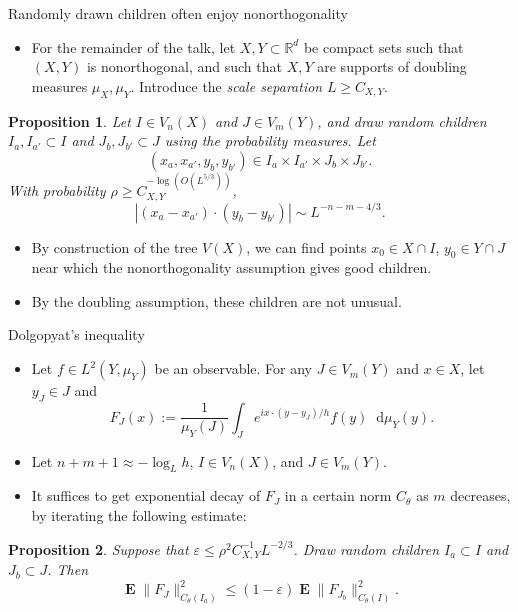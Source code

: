 \documentclass[10pt]{beamer}
\newcommand{\RR}{\mathbb{R}}
\newcommand*\dif{\mathop{}\!\mathrm{d}}
\DeclareMathOperator*{\Expect}{\mathbf E}
\newtheorem{proposition}{Proposition}
\begin{document}
\begin{frame}{Randomly drawn children often enjoy nonorthogonality}
\begin{itemize}
\item For the remainder of the talk, let $X, Y \subset \RR^d$ be compact sets such that $(X, Y)$ is nonorthogonal, and such that $X, Y$ are supports of doubling measures $\mu_X, \mu_Y$. Introduce the \emph{scale separation} $L \geq C_{X, Y}$. \pause
\end{itemize}

\begin{proposition}
Let $I \in V_n(X)$ and $J \in V_m(Y)$, and draw random children $I_a, I_{a'} \subset I$ and $J_b, J_{b'} \subset J$ using the probability measures.
Let
$$(x_a, x_{a'}, y_b, y_{b'}) \in I_a \times I_{a'} \times J_b \times J_{b'}.$$
With probability $\rho \geq C_{X, Y}^{-\log(O(L^{5/3}))}$,
$$|(x_a - x_{a'}) \cdot (y_b - y_{b'})| \sim L^{-n-m-4/3}.$$
\end{proposition} \pause

\begin{itemize}
\item By construction of the tree $V(X)$, we can find points $x_0 \in X \cap I$, $y_0 \in Y \cap J$ near which the nonorthogonality assumption gives good children. \pause
\item By the doubling assumption, these children are not unusual.
\end{itemize}
\end{frame}

\begin{frame}{Dolgopyat's inequality}
\begin{itemize}
\item Let $f \in L^2(Y, \mu_Y)$ be an observable. For any $J \in V_m(Y)$ and $x \in X$, let $y_J \in J$ and 
$$F_J(x) := \frac{1}{\mu_Y(J)} \int_J e^{ix \cdot (y - y_J)/h} f(y) \dif \mu_Y(y).$$ \pause
\item Let $n + m + 1 \approx -\log_L h$, $I \in V_n(X)$, and $J \in V_m(Y)$. \pause
\item It suffices to get exponential decay of $F_J$ in a certain norm $C_\theta$ as $m$ decreases, by iterating the following estimate: \pause
\end{itemize}

\begin{proposition}
Suppose that $\varepsilon \leq \rho^2 C_{X, Y}^{-1} L^{-2/3}$.
Draw random children $I_a \subset I$ and $J_b \subset J$. Then 
$$\Expect \|F_J\|_{C_\theta(I_a)}^2 \leq (1 - \varepsilon) \Expect \|F_{J_b}\|_{C_\theta(I)}^2.$$
\end{proposition}
\end{frame}
\end{document}
